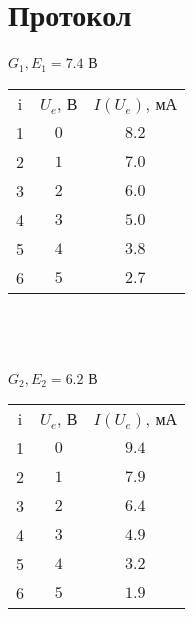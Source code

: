 \section*{Протокол}

$ G_1, E_1 = 7.4 $ В
\\

\begin{tabular}{|ccc|}
    \hline
    i & $ U_e $, В & $ I(U_e) $, мА\\
    1 & $ 0 $ & $ 8.2 $\\
    2 & $ 1 $ & $ 7.0 $\\
    3 & $ 2 $ & $ 6.0 $\\
    4 & $ 3 $ & $ 5.0 $\\
    5 & $ 4 $ & $ 3.8 $\\
    6 & $ 5 $ & $ 2.7 $\\
    \hline
\end{tabular}\\
\\
\\

$ G_2, E_2 = 6.2 $ В
\\

\begin{tabular}{|ccc|}
    \hline
    i & $ U_e $, В & $ I(U_e) $, мА\\
    1 & $ 0 $ & $ 9.4 $\\
    2 & $ 1 $ & $ 7.9 $\\
    3 & $ 2 $ & $ 6.4 $\\
    4 & $ 3 $ & $ 4.9 $\\
    5 & $ 4 $ & $ 3.2 $\\
    6 & $ 5 $ & $ 1.9 $\\
    \hline
\end{tabular}
